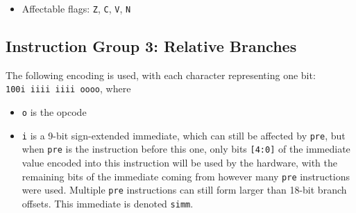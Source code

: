 \documentclass{article}
\begin{document}
\begin{itemize}
\begin{itemize}
			\item Affectable flags:
				\texttt{Z}, \texttt{C}, \texttt{V}, \texttt{N}
		\end{itemize}
	\end{itemize}




	\doublespacing
	\subsection{Instruction Group 3:  Relative Branches}
	The following encoding is used, with each character representing one
	bit:  \\
	\texttt{100i iiii iiii oooo}, where

	\singlespacing
	\begin{itemize}
		\item \texttt{o} is the opcode
		\item \texttt{i} is a 9-bit sign-extended immediate, which can
		still be affected by \texttt{pre}, but when \texttt{pre} is the
		instruction before this one, only bits \texttt{[4:0]} of the
		immediate value encoded into this instruction will be used by the
		hardware, with the remaining bits of the immediate coming from
		however many \texttt{pre} instructions were used.  Multiple
		\texttt{pre} instructions can still form larger than 18-bit branch
		offsets.  This immediate is denoted \texttt{simm}.
	\end{itemize}
	\doublespacing
\end{document}
